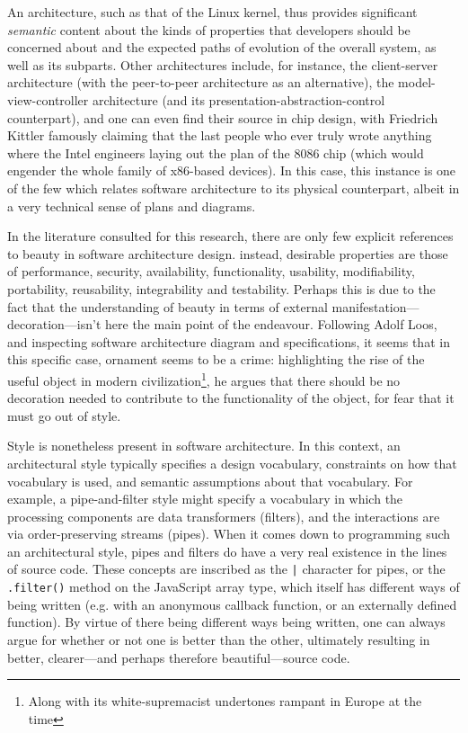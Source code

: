 \documentclass{article}
\begin{document}
An architecture, such as that of the Linux kernel, thus provides significant \emph{semantic}  content  about  the  kinds  of properties that developers should be concerned about and the expected paths of evolution of the overall system, as well as its subparts. Other architectures include, for instance, the client-server architecture (with the peer-to-peer architecture as an alternative), the model-view-controller architecture (and its presentation-abstraction-control counterpart), and one can even find their source in chip design, with Friedrich Kittler famously claiming that the last people who ever truly wrote anything where the Intel engineers laying out the plan of the 8086 chip (which would engender the whole family of x86-based devices)\cite{kittler_there_1997}. In this case, this instance is one of the few which relates software architecture to its physical counterpart, albeit in a very technical sense of plans and diagrams.

In the literature consulted for this research, there are only few explicit references to beauty in software architecture design. instead, desirable properties are those of performance, security, availability, functionality, usability, modifiability, portability, reusability, integrability and testability. Perhaps this is due to the fact that the understanding of beauty in terms of external manifestation—decoration—isn't here the main point of the endeavour. Following Adolf Loos, and inspecting software architecture diagram and specifications, it seems that in this specific case, ornament seems to be a crime: highlighting the rise of the useful object in modern civilization\footnote{Along with its white-supremacist undertones rampant in Europe at the time}, he argues that there should be no decoration needed to contribute to the functionality of the object, for fear that it must go out of style.

Style is nonetheless present in software architecture. In this context, an architectural style typically specifies a design vocabulary, constraints on how that vocabulary is used, and semantic assumptions about that vocabulary. For example, a pipe-and-filter style might specify a vocabulary in which the processing components are data transformers (filters), and the interactions are via order-preserving streams (pipes). When it comes down to programming such an architectural style, pipes and filters do have a very real existence in the lines of source code. These concepts are inscribed as the \lstinline{|} character for pipes, or the \lstinline{.filter()} method on the JavaScript array type, which itself has different ways of being written (e.g. with an anonymous callback function, or an externally defined function). By virtue of there being different ways being written, one can always argue for whether or not one is better than the other, ultimately resulting in better, clearer—and perhaps therefore beautiful—source code.
\end{document}
